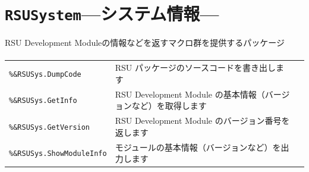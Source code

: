 \section{\texttt{RSUSystem}\;---\;システム情報\;---}\label{sec:RSUSystem}
RSU Development Moduleの情報などを返すマクロ群を提供するパッケージ
\paragraph{\DocStrTitleRDMPackageFunctionList}
\begin{center}
{\footnotesize
\begin{xltabular}{\textwidth}{|p{4truecm}|X|p{1.2truecm}|}
\hline
\thead{\DocStrHeaderFunctionName}&\thead{\DocStrDescription}&\thead{\DocStrRefto}\\
\hline
\hline
\texttt{\%\&RSUSys.DumpCode}&RSU パッケージのソースコードを書き出します&\\
\hline
\texttt{\%\&RSUSys.GetInfo}&RSU Development Module の基本情報（バージョンなど）を取得します&\\
\hline
\texttt{\%\&RSUSys.GetVersion}&RSU Development Module のバージョン番号を返します&\\
\hline
\texttt{\%\&RSUSys.ShowModuleInfo}&モジュールの基本情報（バージョンなど）を出力します&\\
\hline
\end{xltabular}
}
\end{center}
